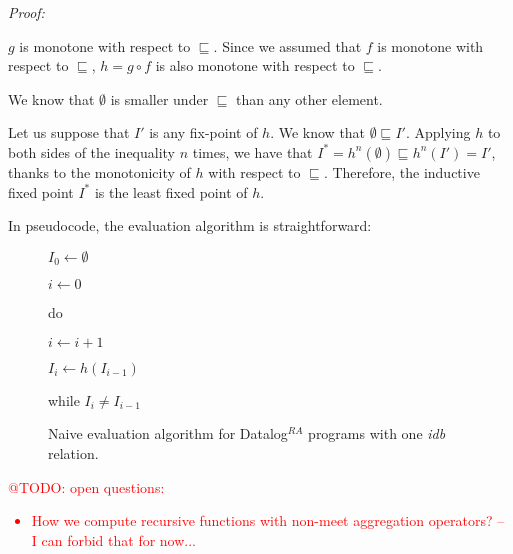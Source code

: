 \documentclass{pracamgr}
\makeatletter
\theoremstyle{plain}
\theoremstyle{definition}
\theoremstyle{remark}
\newcommand{\todo}[1]{\textcolor{red}{@TODO: #1}}
\newcommand{\datalogra}{Datalog$^{RA}$ }
\newcommand{\narrow}[1]{\begin{changemargin}{2cm}{2cm} #1 \end{changemargin}}
\makeatother
\begin{document}
\emph{Proof:} 

$g$ is monotone with respect to $\sqsubseteq$. Since we assumed that $f$ is monotone with respect to $\sqsubseteq$, $h = g \circ f$ is also monotone with respect to $\sqsubseteq$. 

We know that $\emptyset$ is smaller under $\sqsubseteq$ than any other element.

Let us suppose that $I'$ is any fix-point of $h$.  We know that $\emptyset \sqsubseteq I'$. Applying $h$ to both sides of the inequality $n$ times, we have that $I^* = h^n(\emptyset) \sqsubseteq h^n(I') = I'$, thanks to the monotonicity of $h$ with respect to $\sqsubseteq$. Therefore, the inductive fixed point $I^*$ is the least fixed point of $h$.

In pseudocode, the evaluation algorithm is straightforward:

\begin{figure}[h!]
\narrow{
$I_0 \leftarrow \emptyset$

$i \leftarrow 0$

do

{\addtolength{\leftskip}{5mm}

$i \leftarrow i + 1$

$I_i \leftarrow h(I_{i-1})$

}

while $I_i \ne I_{i-1}$


\caption{Naive evaluation algorithm for \datalogra programs with one \textit{idb} relation.}
}
\end{figure}



\todo{open questions:
\begin{itemize}
\item How we compute recursive functions with non-meet aggregation operators? -- I can forbid that for now...
\end{itemize}
}
\end{document}
